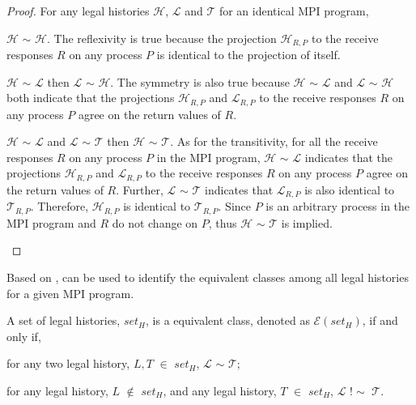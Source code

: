 \begin{proof}
For any legal histories $\mathcal{H}$, $\mathcal{L}$ and $\mathcal{T}$ for an identical MPI program,
\begin{compactenum}
\item $\mathcal{H}$ $\sim$ $\mathcal{H}$. The reflexivity is true because the projection $\mathcal{H}_{R,P}$ to the receive responses $R$ on any process $P$ is identical to the projection of itself.
\item $\mathcal{H}$ $\sim$ $\mathcal{L}$ then $\mathcal{L}$ $\sim$ $\mathcal{H}$. The symmetry is also true because $\mathcal{H}$ $\sim$ $\mathcal{L}$ and $\mathcal{L}$ $\sim$ $\mathcal{H}$ both indicate that the projections $\mathcal{H}_{R,P}$ and $\mathcal{L}_{R,P}$ to the receive responses $R$ on any process $P$ agree on the return values of $R$. 
\item $\mathcal{H}$ $\sim$ $\mathcal{L}$ and $\mathcal{L}$ $\sim$ $\mathcal{T}$ then $\mathcal{H}$ $\sim$ $\mathcal{T}$. As for the transitivity, for all the receive responses $R$ on any process $P$ in the MPI program, $\mathcal{H}$ $\sim$ $\mathcal{L}$ indicates that the projections $\mathcal{H}_{R,P}$ and $\mathcal{L}_{R,P}$ to the receive responses $R$ on any process $P$ agree on the return values of $R$. Further, $\mathcal{L}$ $\sim$ $\mathcal{T}$ indicates that $\mathcal{L}_{R,P}$ is also identical to $\mathcal{T}_{R,P}$. Therefore, $\mathcal{H}_{R,P}$ is identical to $\mathcal{T}_{R,P}$. Since $P$ is an arbitrary process in the MPI program and $R$ do not change on $P$, thus $\mathcal{H}$ $\sim$ $\mathcal{T}$ is implied.
\end{compactenum}
\end{proof}

Based on ,  can be used to identify the equivalent classes among all legal histories for a given MPI program. 

\begin{definition}\label{def:equal_class}
A set of legal histories, $\mathit{set_H}$, is a equivalent class, denoted as $\mathcal{E}$$(\mathit{set_H})$, if and only if,
\begin{compactenum}
\item for any two legal history, $L,T$ $\in$ $\mathit{set_H}$, $\mathcal{L}$ $\sim$ $\mathcal{T}$;
\item for any legal history, $L$ $\notin$ $\mathit{set_H}$, and any legal history, $T$ $\in$ $\mathit{set_H}$, $\mathcal{L}$ $!\sim$ $\mathcal{T}$.
\end{compactenum}
\end{definition}

